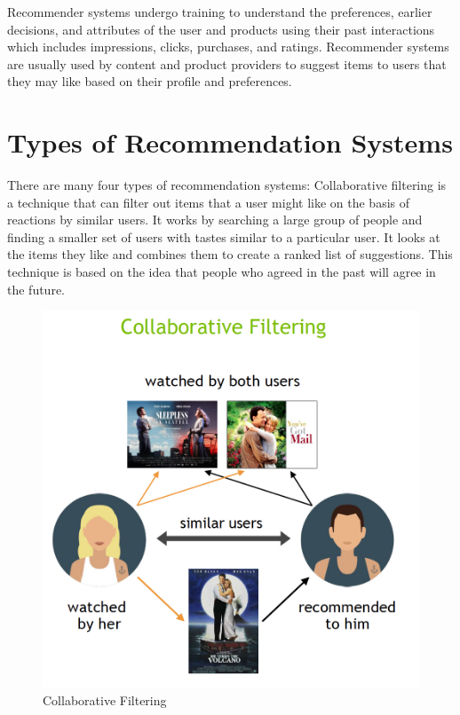 Recommender systems undergo training to understand the preferences, earlier decisions, and attributes of the user and products using their past interactions which includes impressions, clicks, purchases, and ratings. Recommender systems are usually used by content and product providers to suggest items to users that they may like based on their profile and preferences.

\section{Types of Recommendation Systems}\label{sec:types-of-recommendation-systems}
There are many four types of recommendation systems:
\label{subsec:collaborative-filtering}
Collaborative filtering is a technique that can filter out items that a user might like on the basis of reactions by similar users. It works by searching a large group of people and finding a smaller set of users with tastes similar to a particular user. It looks at the items they like and combines them to create a ranked list of suggestions. This technique is based on the idea that people who agreed in the past will agree in the future.
\begin{figure}[htbp]
    \centering
    \includegraphics[width=\textwidth]{assets/collaborative_filtering.png}
    \caption{Collaborative Filtering}
    \label{fig:collaborative-filtering}
\end{figure}

